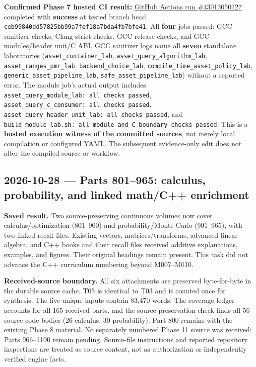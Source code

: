 \textbf{Confirmed Phase 7 hosted CI result:} \href{https://github.com/swayam8624/Project_008_AllMight/actions/runs/43013050127}{GitHub Actions run \#43013050127} completed with \textbf{success} at tested branch head \texttt{ceb99840dd57825bb99a7fef18a7bda4fb7bfe41}. All \textbf{four} jobs passed: GCC sanitizer checks, Clang strict checks, GCC release checks, and GCC modules/header unit/C ABI. GCC sanitizer logs name all \textbf{seven} standalone laboratories (\texttt{asset\_container\_lab}, \texttt{asset\_query\_algorithm\_lab}, \texttt{asset\_ranges\_pmr\_lab}, \texttt{backend\_choice\_lab}, \texttt{compile\_time\_asset\_policy\_lab}, \texttt{generic\_asset\_pipeline\_lab}, \texttt{safe\_asset\_pipeline\_lab}) without a reported error. The module job's actual output includes \texttt{asset\_query\_module\_lab:\ all\ checks\ passed}, \texttt{asset\_query\_c\_consumer:\ all\ checks\ passed}, \texttt{asset\_query\_header\_unit\_lab:\ all\ checks\ passed}, and \texttt{build\_module\_lab.sh:\ all\ module\ and\ C\ boundary\ checks\ passed}. This is a \textbf{hosted execution witness of the committed sources}, not merely local compilation or configured YAML. The subsequent evidence-only edit does not alter the compiled source or workflow.

\subsection{2026-10-28 --- Parts 801--965: calculus, probability, and linked math/C++ enrichment}\label{appendix-a103e7846d21-parts-801965-calculus-probability-and-linked-mathc-enrichment}

\textbf{Saved result.} Two source-preserving continuous volumes now cover calculus/optimization (801--900) and probability/Monte Carlo (901--965), with two linked recall files. Existing vectors, matrices/transforms, advanced linear algebra, and C++ books and their recall files received additive explanations, examples, and figures. Their original headings remain present. This task did not advance the C++ curriculum numbering beyond M007--M010.

\textbf{Received-source boundary.} All six attachments are preserved byte-for-byte in the durable source cache. T05 is identical to T03 and is counted once for synthesis. The five unique inputs contain 83,470 words. The coverage ledger accounts for all 165 received parts, and the source-preservation check finds all 56 source code bodies (26 calculus, 30 probability). Part 800 remains with the existing Phase 8 material. No separately numbered Phase 11 source was received; Parts 966--1100 remain pending. Source-file instructions and reported repository inspections are treated as source content, not as authorization or independently verified engine facts.

